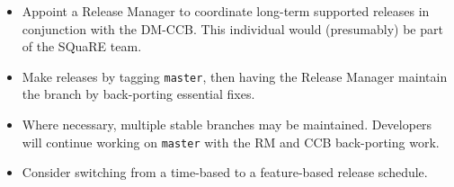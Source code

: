 \documentclass[DM,toc]{lsstdoc}
\begin{document}
\begin{itemize}

  \item{Appoint a Release Manager to coordinate long-term supported releases
  in conjunction with the DM-CCB. This individual would (presumably) be part
  of the SQuaRE team.}

  \item{Make releases by tagging \texttt{master}, then having the Release
  Manager maintain the branch by back-porting essential fixes.}

  \item{Where necessary, multiple stable branches may be maintained.
  Developers will continue working on \texttt{master} with the RM and CCB
  back-porting work.}

  \item{Consider switching from a time-based to a feature-based release
  schedule.}

\end{itemize}
\end{document}
